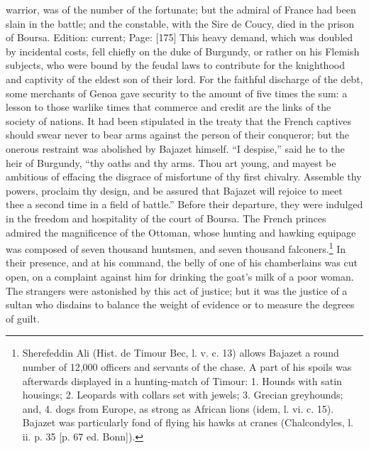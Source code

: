 warrior, was of the number of the fortunate; but the admiral of France had been slain in the battle; and the constable, with the Sire de Coucy, died in the prison of Boursa. Edition: current; Page: [175] This heavy demand, which was doubled by incidental costs, fell chiefly on the duke of Burgundy, or rather on his Flemish subjects, who were bound by the feudal laws to contribute for the knighthood and captivity of the eldest son of their lord. For the faithful discharge of the debt, some merchants of Genoa gave security to the amount of five times the sum: a lesson to those warlike times that commerce and credit are the links of the society of nations. It had been stipulated in the treaty that the French captives should swear never to bear arms against the person of their conqueror; but the onerous restraint was abolished by Bajazet himself. \texthebrew{“}I despise,\texthebrew{}” said he to the heir of Burgundy, \texthebrew{“}thy oaths and thy arms. Thou art young, and mayest be ambitious of effacing the disgrace of misfortune of thy first chivalry. Assemble thy powers, proclaim thy design, and be assured that Bajazet will rejoice to meet thee a second time in a field of battle.\texthebrew{}” Before their departure, they were indulged in the freedom and hospitality of the court of Boursa. The French princes admired the magnificence of the Ottoman, whose hunting and hawking equipage was composed of seven thousand huntsmen, and seven thousand falconers.\footnote{Sherefeddin Ali (Hist. de Timour Bec, l. v. c. 13) allows Bajazet a round number of 12,000 officers and servants of the chase. A part of his spoils was afterwards displayed in a hunting-match of Timour: 1. Hounds with satin housings; 2. Leopards with collars set with jewels; 3. Grecian greyhounds; and, 4. dogs from Europe, as strong as African lions (idem, l. vi. c. 15). Bajazet was particularly fond of flying his hawks at cranes (Chalcondyles, l. ii. p. 35 [p. 67 ed. Bonn]).} In their presence, and at his command, the belly of one of his chamberlains was cut open, on a complaint against him for drinking the goat\texthebrew{}’s milk of a poor woman. The strangers were astonished by this act of justice; but it was the justice of a sultan who disdains to balance the weight of evidence or to measure the degrees of guilt.


